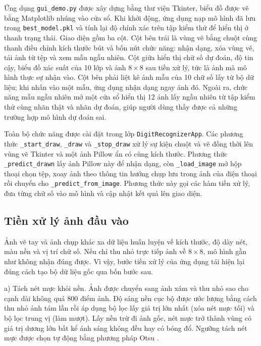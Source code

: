 \documentclass[a4paper,oneside]{report}
\begin{document}
Ứng dụng \nolinkurl{gui_demo.py} được xây dựng bằng thư viện Tkinter, biểu đồ được vẽ bằng Matplotlib nhúng vào cửa
sổ. Khi khởi động, ứng dụng nạp mô hình đã lưu trong \nolinkurl{best_model.pkl} và tính lại độ chính xác trên tập
kiểm thử để hiển thị ở thanh trạng thái. Giao diện gồm ba cột. Cột bên trái là vùng vẽ bằng chuột cùng thanh điều
chỉnh kích thước bút và bốn nút chức năng: nhận dạng, xóa vùng vẽ, tải ảnh từ tệp và xem mẫu ngẫu nhiên. Cột giữa
hiển thị chữ số dự đoán, độ tin cậy, biểu đồ xác suất của 10 lớp và ảnh $8 \times 8$ sau tiền xử lý, tức là ảnh mà
mô hình thực sự nhận vào. Cột bên phải liệt kê ảnh mẫu của 10 chữ số lấy từ bộ dữ liệu; khi nhấn vào một mẫu, ứng
dụng nhận dạng ngay ảnh đó. Ngoài ra, chức năng mẫu ngẫu nhiên mở một cửa sổ hiển thị 12 ảnh lấy ngẫu nhiên từ tập
kiểm thử cùng nhãn thật và nhãn dự đoán, giúp người dùng thấy được cả những trường hợp mô hình dự đoán sai.

Toàn bộ chức năng được cài đặt trong lớp \texttt{DigitRecognizerApp}. Các phương thức \texttt{\_start\_draw},
\texttt{\_draw} và \texttt{\_stop\_draw} xử lý sự kiện chuột và vẽ đồng thời lên vùng vẽ Tkinter và một ảnh Pillow
ẩn có cùng kích thước. Phương thức \texttt{\_predict\_drawn} lấy ảnh Pillow này để nhận dạng, còn
\texttt{\_load\_image} mở hộp thoại chọn tệp, xoay ảnh theo thông tin hướng chụp lưu trong ảnh của điện thoại rồi
chuyển cho \texttt{\_predict\_from\_image}. Phương thức này gọi các hàm tiền xử lý, đưa từng chữ số vào mô hình và
cập nhật kết quả lên giao diện.

\subsection{Tiền xử lý ảnh đầu vào}

Ảnh vẽ tay và ảnh chụp khác xa dữ liệu huấn luyện về kích thước, độ dày nét, màu nền và vị trí chữ số. Nếu chỉ
thu nhỏ trực tiếp ảnh về $8 \times 8$, mô hình gần như không nhận đúng được. Vì vậy, bước tiền xử lý của ứng dụng
tái hiện lại đúng cách tạo bộ dữ liệu gốc qua bốn bước sau.

a) Tách nét mực khỏi nền. Ảnh được chuyển sang ảnh xám và thu nhỏ sao cho cạnh dài không quá 800 điểm ảnh. Độ
sáng nền cục bộ được ước lượng bằng cách thu nhỏ ảnh tám lần rồi áp dụng bộ lọc lấy giá trị lớn nhất (xóa nét mực
tối) và bộ lọc trung vị (làm mượt). Lấy nền trừ đi ảnh gốc, nét mực trở thành vùng có giá trị dương lớn bất kể
ánh sáng không đều hay có bóng đổ. Ngưỡng tách nét mực được chọn tự động bằng phương pháp Otsu \cite{otsu}.
\end{document}
